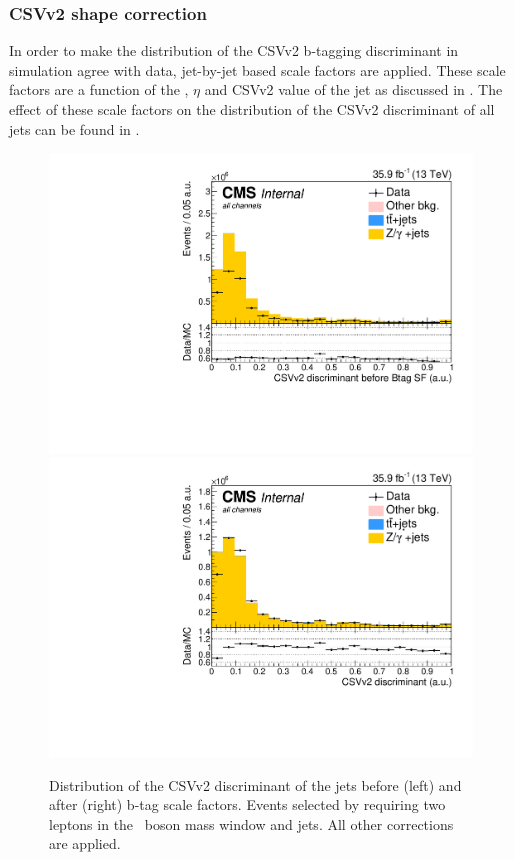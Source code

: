 \subsubsection*{CSVv2 shape correction}
In order to make the distribution of the CSVv2 b-tagging discriminant in simulation agree with data,  jet-by-jet based scale factors are applied. These scale factors are a function of the \pt, $\eta$ and CSVv2 value of the jet as discussed in .  The effect of these scale factors on the distribution of the CSVv2 discriminant of all jets can be found in .


\begin{figure}[htbp]
	\centering
	\includegraphics[width=0.49\linewidth]{5_Eventselection/Figures/Reweighing/2lepcontrol_dilep_bdisc_bfBT_all_Stack}
	\includegraphics[width=0.49\linewidth]{5_Eventselection/Figures/Reweighing/2lepcontrol_dilep_bdisc_all_Stack}	
	\caption{Distribution of the CSVv2 discriminant of the jets before (left) and after (right) b-tag scale factors.  Events selected by requiring two leptons in the \PZ\ boson mass window and jets. All other corrections are applied.}
	\label{fig:bSF}
\end{figure}

